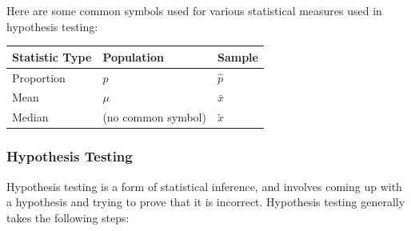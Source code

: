 \documentclass[10pt]{article}
\begin{document}
Here are some common symbols used for various statistical measures used in hypothesis testing:
\begin{center}
    \begin{tabular}{|l|l|l|}
\hline
\rowcolor[HTML]{EFEFEF} 
\textbf{Statistic Type} & \textbf{Population} & \textbf{Sample} \\ \hline
Proportion              & $p$                 & $\hat p$        \\ \hline
Mean                    & $\mu$               & $\bar x$        \\ \hline
Median                  & (no common symbol)  & $\tilde x$      \\ \hline
\end{tabular}
\end{center}
\newpage
\subsubsection{Hypothesis Testing}
Hypothesis testing is a form of statistical inference, and involves coming up with a hypothesis and trying to prove that it is incorrect. Hypothesis testing generally takes the following steps:
\end{document}

